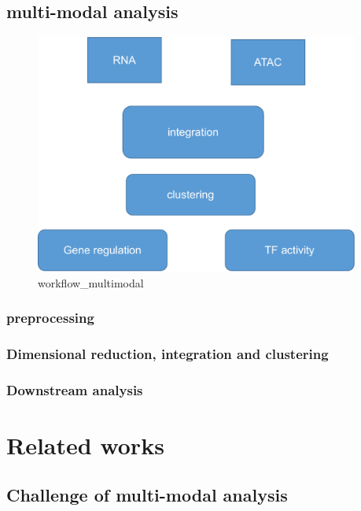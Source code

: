 \subsection{multi-modal analysis}
\begin{figure}[!ht]
	\centering
	\includegraphics[width=0.95\textwidth]{workflow_multimodal/fig}
	\vspace{0.1cm}
	\caption[workflow\_multimodal.]{workflow\_multimodal}
	\label{fig:workflow_multimodal}
\end{figure}
\subsubsection{preprocessing}
\subsubsection{Dimensional reduction, integration and clustering}
\subsubsection{Downstream analysis}


\section{Related works}
\subsection{Challenge of multi-modal analysis}

